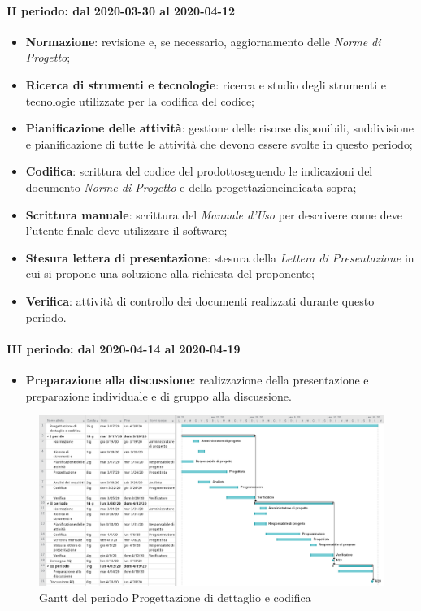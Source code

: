 \paragraph*{II periodo: dal 2020-03-30 al 2020-04-12}
\begin{itemize}
	\item \textbf{Normazione}: revisione e, se necessario, aggiornamento delle \textit{Norme di Progetto};
	\item \textbf{Ricerca di strumenti e tecnologie}: ricerca e studio degli strumenti e tecnologie utilizzate per la codifica del codice;
	\item \textbf{Pianificazione delle attività}: gestione delle risorse disponibili, suddivisione e pianificazione di tutte le attività che devono essere svolte in questo periodo;
	\item \textbf{Codifica}: scrittura del codice del prodotto\glosp seguendo le indicazioni del documento \textit{Norme di Progetto} e della progettazione\glosp indicata sopra;
	\item \textbf{Scrittura manuale}: scrittura del \textit{Manuale d'Uso} per descrivere come deve l'utente finale deve utilizzare il software;
	\item \textbf{Stesura lettera di presentazione}: stesura della \textit{Lettera di Presentazione} in cui si propone una soluzione alla richiesta del proponente;
	\item \textbf{Verifica}: attività di controllo dei documenti realizzati durante questo periodo.
\end{itemize}

\paragraph*{III periodo: dal 2020-04-14 al 2020-04-19}
\begin{itemize}
	\item \textbf{Preparazione alla discussione}: realizzazione della presentazione e preparazione individuale e di gruppo alla discussione.
\end{itemize}

\begin{landscape}
	\begin{figure}[H] 	
		\includegraphics[width=\linewidth]{./gantt/Progettazione di dettaglio e codifica.png}	
		\caption{Gantt del periodo Progettazione di dettaglio e codifica}	
	\end{figure}
\end{landscape}


